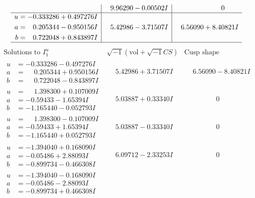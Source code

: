 \documentclass[1p]{elsarticle_modified}
\theoremstyle{definition}
\newcommand{\I}{\sqrt{-1}}
\begin{document}
$$\begin{array}{c|c|c}
 & \phantom{-}9.96290 - 0.00502 I & \phantom{-0.000000 } 0 \\ \hline\begin{aligned}
u &= -0.333286 + 0.497276 I \\
a &= \phantom{-}0.205344 - 0.950156 I \\
b &= \phantom{-}0.722048 + 0.843897 I\end{aligned}
 & \phantom{-}5.42986 - 3.71507 I & \phantom{-}6.56090 + 8.40821 I\\
 \hline 
 \end{array}$$\newpage$$\begin{array}{c|c|c}  
\text{Solutions to }I^u_{1}& \I (\text{vol} + \sqrt{-1}CS) & \text{Cusp shape}\\
 \hline 
\begin{aligned}
u &= -0.333286 - 0.497276 I \\
a &= \phantom{-}0.205344 + 0.950156 I \\
b &= \phantom{-}0.722048 - 0.843897 I\end{aligned}
 & \phantom{-}5.42986 + 3.71507 I & \phantom{-}6.56090 - 8.40821 I \\ \hline\begin{aligned}
u &= \phantom{-}1.398300 + 0.107009 I \\
a &= -0.59433 - 1.65394 I \\
b &= -1.165440 - 0.052793 I\end{aligned}
 & \phantom{-}5.03887 + 0.33340 I & \phantom{-0.000000 } 0 \\ \hline\begin{aligned}
u &= \phantom{-}1.398300 - 0.107009 I \\
a &= -0.59433 + 1.65394 I \\
b &= -1.165440 + 0.052793 I\end{aligned}
 & \phantom{-}5.03887 - 0.33340 I & \phantom{-0.000000 } 0 \\ \hline\begin{aligned}
u &= -1.394040 + 0.168090 I \\
a &= -0.05486 + 2.88093 I \\
b &= -0.899734 - 0.466308 I\end{aligned}
 & \phantom{-}6.09712 - 2.33253 I & \phantom{-0.000000 } 0 \\ \hline\begin{aligned}
u &= -1.394040 - 0.168090 I \\
a &= -0.05486 - 2.88093 I \\
b &= -0.899734 + 0.466308 I\end{aligned}

\end{array}$$
\end{document}
